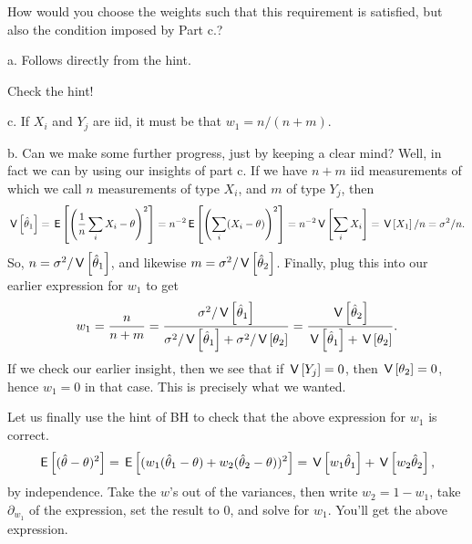 \begin{exercise}
\begin{hint}
How would you choose the weights such that this requirement is satisfied, but also the condition imposed by Part c.?
\end{hint}


\begin{solution}
a. Follows directly from the hint.

Check the hint!

c.  If $X_i$ and $Y_j$ are iid, it must be that $w_{1} = n/(n+m)$.

b. Can we make some further progress, just by keeping a clear mind?
Well, in fact we can by using our insights of part c.
If we have $n+m$ iid measurements of which we call $n$ measurements of type $X_i$, and $m$ of type $Y_{j}$, then
\begin{align*}
\,\mathsf{V}\left[\hat \theta_{1}\right]  =  \,\mathsf{E}\left[\left(\frac{1}{n}\sum_{i}X_{i} - \theta\right)^2\right] = n^{-2}\,\mathsf{E}\left[\left(\sum_i (X_{i}-\theta)\right)^{2}\right] = n^{-2}\,\mathsf{V}\left[\sum_i X_i\right] = \,\mathsf{V}\left[X_1\right]/n = \sigma^{2}/n.
\end{align*}
So, $n=\sigma^{2}/\,\mathsf{V}\left[\hat \theta_1\right]$, and likewise $m=\sigma^{2}/\,\mathsf{V}\left[\hat \theta_2\right]$. Finally, plug this into our earlier expression for $w_1$ to  get
\begin{align*}
w_1 = \frac n {n+m} = \frac{\sigma^2/\,\mathsf{V}\left[\hat \theta_1\right]}{\sigma^2/\,\mathsf{V}\left[\hat \theta_1\right] + \sigma^2/\,\mathsf{V}\left[\theta_2\right]} = \frac{\,\mathsf{V}\left[\hat \theta_2\right]}{\,\mathsf{V}\left[\hat \theta_1\right] + \,\mathsf{V}\left[\theta_2\right]}.
\end{align*}
If we check our earlier insight, then we see that if $\,\mathsf{V}\left[Y_j\right]=0$, then $\,\mathsf{V}\left[\theta_2\right]=0$, hence $w_1=0$ in that case. This is precisely what we wanted.

Let us finally use the  hint of BH to check that the above expression for $w_1$ is correct.
\begin{align*}
\,\mathsf{E}\left[(\hat \theta -\theta)^{2}\right] =
\,\mathsf{E}\left[(w_1(\hat \theta_{1} - \theta) + w_2(\hat \theta_{2}-\theta))^{2}\right] =
\,\mathsf{V}\left[w_1 \hat \theta_{1}\right] + \,\mathsf{V}\left[w_2 \hat \theta_{2}\right],
\end{align*}
by independence. Take the $w$'s out of the variances, then write $w_2=1-w_1$, take $\partial_{w_1}$ of the expression,  set the result to 0, and solve for $w_1$. You'll get the above expression.
\end{solution}
\end{exercise}


